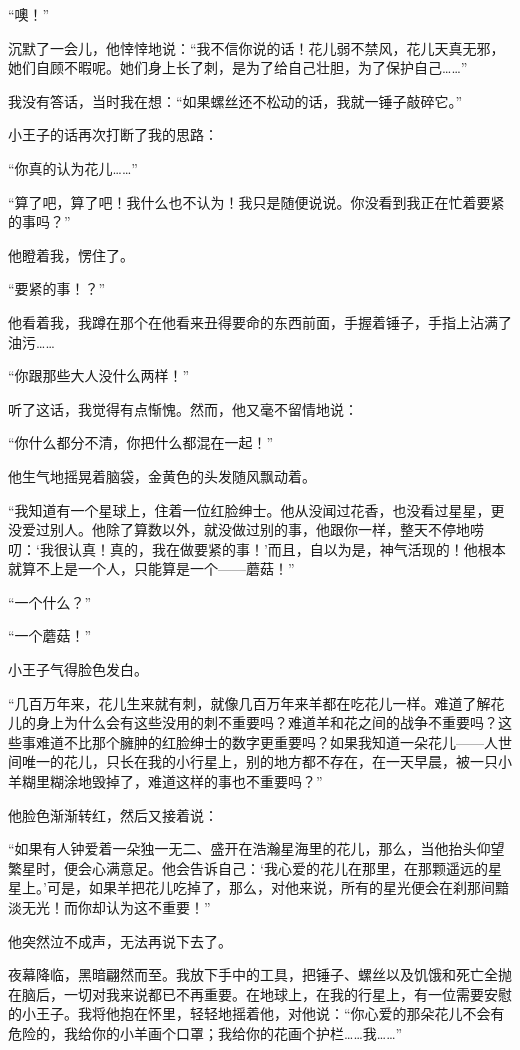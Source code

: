 “噢！”

沉默了一会儿，他悻悻地说：“我不信你说的话！花儿弱不禁风，花儿天真无邪，她们自顾不暇呢。她们身上长了刺，是为了给自己壮胆，为了保护自己\ldots{}\ldots{}”

我没有答话，当时我在想：“如果螺丝还不松动的话，我就一锤子敲碎它。”

小王子的话再次打断了我的思路：

“你真的认为花儿\ldots{}\ldots{}”

“算了吧，算了吧！我什么也不认为！我只是随便说说。你没看到我正在忙着要紧的事吗？”

他瞪着我，愣住了。

“要紧的事！？”

他看着我，我蹲在那个在他看来丑得要命的东西前面，手握着锤子，手指上沾满了油污\ldots{}\ldots{}

“你跟那些大人没什么两样！”

听了这话，我觉得有点惭愧。然而，他又毫不留情地说：

“你什么都分不清，你把什么都混在一起！”

他生气地摇晃着脑袋，金黄色的头发随风飘动着。

“我知道有一个星球上，住着一位红脸绅士。他从没闻过花香，也没看过星星，更没爱过别人。他除了算数以外，就没做过别的事，他跟你一样，整天不停地唠叨：‘我很认真！真的，我在做要紧的事！'而且，自以为是，神气活现的！他根本就算不上是一个人，只能算是一个------蘑菇！”

“一个什么？”

“一个蘑菇！”

小王子气得脸色发白。

“几百万年来，花儿生来就有刺，就像几百万年来羊都在吃花儿一样。难道了解花儿的身上为什么会有这些没用的刺不重要吗？难道羊和花之间的战争不重要吗？这些事难道不比那个臃肿的红脸绅士的数字更重要吗？如果我知道一朵花儿------人世间唯一的花儿，只长在我的小行星上，别的地方都不存在，在一天早晨，被一只小羊糊里糊涂地毁掉了，难道这样的事也不重要吗？”

他脸色渐渐转红，然后又接着说：

“如果有人钟爱着一朵独一无二、盛开在浩瀚星海里的花儿，那么，当他抬头仰望繁星时，便会心满意足。他会告诉自己：‘我心爱的花儿在那里，在那颗遥远的星星上。'可是，如果羊把花儿吃掉了，那么，对他来说，所有的星光便会在刹那间黯淡无光！而你却认为这不重要！”

他突然泣不成声，无法再说下去了。

夜幕降临，黑暗翩然而至。我放下手中的工具，把锤子、螺丝以及饥饿和死亡全抛在脑后，一切对我来说都已不再重要。在地球上，在我的行星上，有一位需要安慰的小王子。我将他抱在怀里，轻轻地摇着他，对他说：“你心爱的那朵花儿不会有危险的，我给你的小羊画个口罩；我给你的花画个护栏\ldots{}\ldots{}我\ldots{}\ldots{}”

